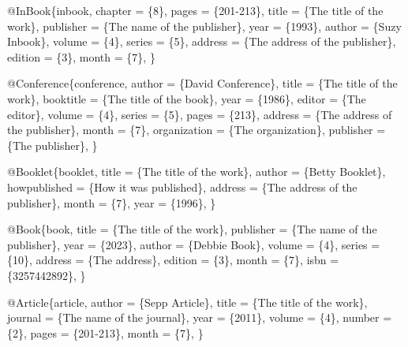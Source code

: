 \documentclass[
  stu,
  floatsintext,
  longtable,
  a4paper,
  nolmodern,
  notxfonts,
  notimes,
  colorlinks=true,linkcolor=black,citecolor=black,urlcolor=black]{apa7}
\newenvironment{Shaded}{\begin{snugshade}}{\end{snugshade}}
\newcommand{\NormalTok}[1]{\textcolor[rgb]{0.00,0.23,0.31}{#1}}
\begin{document}
\begin{Shaded}
\begin{Highlighting}[]
\NormalTok{    @InBook\{inbook,}
\NormalTok{        chapter   = \{8\},}
\NormalTok{        pages     = \{201{-}213\},}
\NormalTok{        title     = \{The title of the work\},}
\NormalTok{        publisher = \{The name of the publisher\},}
\NormalTok{        year      = \{1993\},}
\NormalTok{        author    = \{Suzy Inbook\},}
\NormalTok{        volume    = \{4\},}
\NormalTok{        series    = \{5\},}
\NormalTok{        address   = \{The address of the publisher\},}
\NormalTok{        edition   = \{3\},}
\NormalTok{        month     = \{7\},}
\NormalTok{    \}}
    
\NormalTok{    @Conference\{conference,}
\NormalTok{        author       = \{David Conference\},}
\NormalTok{        title        = \{The title of the work\},}
\NormalTok{        booktitle    = \{The title of the book\},}
\NormalTok{        year         = \{1986\},}
\NormalTok{        editor       = \{The editor\},}
\NormalTok{        volume       = \{4\},}
\NormalTok{        series       = \{5\},}
\NormalTok{        pages        = \{213\},}
\NormalTok{        address      = \{The address of the publisher\},}
\NormalTok{        month        = \{7\},}
\NormalTok{        organization = \{The organization\},}
\NormalTok{        publisher    = \{The publisher\},}
\NormalTok{    \}}
    
\NormalTok{    @Booklet\{booklet,}
\NormalTok{        title        = \{The title of the work\},}
\NormalTok{        author       = \{Betty Booklet\},}
\NormalTok{        howpublished = \{How it was published\},}
\NormalTok{        address      = \{The address of the publisher\},}
\NormalTok{        month        = \{7\},}
\NormalTok{        year         = \{1996\},}
\NormalTok{    \}}
    
\NormalTok{    @Book\{book,}
\NormalTok{        title     = \{The title of the work\},}
\NormalTok{        publisher = \{The name of the publisher\},}
\NormalTok{        year      = \{2023\},}
\NormalTok{        author    = \{Debbie Book\},}
\NormalTok{        volume    = \{4\},}
\NormalTok{        series    = \{10\},}
\NormalTok{        address   = \{The address\},}
\NormalTok{        edition   = \{3\},}
\NormalTok{        month     = \{7\},}
\NormalTok{        isbn      = \{3257442892\},}
\NormalTok{    \}}
    
\NormalTok{    @Article\{article,}
\NormalTok{        author  = \{Sepp Article\},}
\NormalTok{        title   = \{The title of the work\},}
\NormalTok{        journal = \{The name of the journal\},}
\NormalTok{        year    = \{2011\},}
\NormalTok{        volume  = \{4\},}
\NormalTok{        number  = \{2\},}
\NormalTok{        pages   = \{201{-}213\},}
\NormalTok{        month   = \{7\},}
\NormalTok{    \}}
    

\end{Highlighting}
\end{Shaded}
\end{document}
